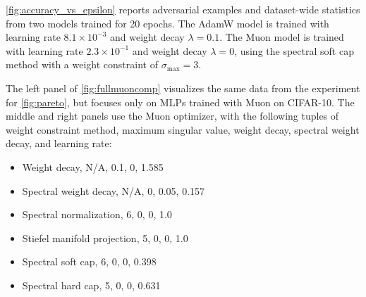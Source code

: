 \cref{fig:accuracy_vs_epsilon} reports adversarial examples and dataset-wide statistics from two models trained for 20 epochs. The AdamW model is trained with learning rate $8.1 \times 10^{-3}$ and weight decay $\lambda = 0.1$. The Muon model is trained with learning rate $2.3 \times 10^{-1}$ and weight decay $\lambda = 0$, using the spectral soft cap method with a weight constraint of $\sigma_\text{max} = 3$.

The left panel of \cref{fig:fullmuoncomp} visualizes the same data from the experiment for \cref{fig:pareto}, but focuses only on MLPs trained with Muon on CIFAR-10. The middle and right panels use the Muon optimizer, with the following tuples of weight constraint method, maximum singular value, weight decay, spectral weight decay, and learning rate:
\begin{itemize}
    \item Weight decay, N/A, 0.1, 0, 1.585
    \item Spectral weight decay, N/A, 0, 0.05, 0.157
    \item Spectral normalization, 6, 0, 0, 1.0
    \item Stiefel manifold projection, 5, 0, 0, 1.0
    \item Spectral soft cap, 6, 0, 0, 0.398
    \item Spectral hard cap, 5, 0, 0, 0.631
\end{itemize}

